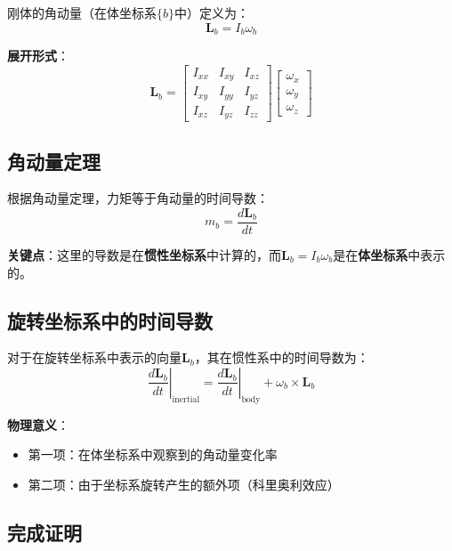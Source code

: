 \documentclass[12pt,a4paper]{article}
\begin{document}
刚体的角动量（在体坐标系$\{b\}$中）定义为：
\begin{equation}
\bm{L}_b = I_b \omega_b
\label{eq:angular_momentum}
\end{equation}

\textbf{展开形式}：
\begin{equation}
\bm{L}_b = \begin{bmatrix}
I_{xx} & I_{xy} & I_{xz} \\
I_{xy} & I_{yy} & I_{yz} \\
I_{xz} & I_{yz} & I_{zz}
\end{bmatrix} \begin{bmatrix}
\omega_x \\
\omega_y \\
\omega_z
\end{bmatrix}
\end{equation}

\subsection{角动量定理}

根据角动量定理，力矩等于角动量的时间导数：
\begin{equation}
m_b = \frac{d\bm{L}_b}{dt}
\label{eq:angular_momentum_theorem}
\end{equation}

\textbf{关键点}：这里的导数是在\textbf{惯性坐标系}中计算的，而$\bm{L}_b = I_b \omega_b$是在\textbf{体坐标系}中表示的。

\subsection{旋转坐标系中的时间导数}

对于在旋转坐标系中表示的向量$\bm{L}_b$，其在惯性系中的时间导数为：
\begin{equation}
\left.\frac{d\bm{L}_b}{dt}\right|_{\text{inertial}} = \left.\frac{d\bm{L}_b}{dt}\right|_{\text{body}} + \omega_b \times \bm{L}_b
\label{eq:rotating_frame_derivative}
\end{equation}

\textbf{物理意义}：
\begin{itemize}
\item 第一项：在体坐标系中观察到的角动量变化率
\item 第二项：由于坐标系旋转产生的额外项（科里奥利效应）
\end{itemize}

\subsection{完成证明}
\end{document}
